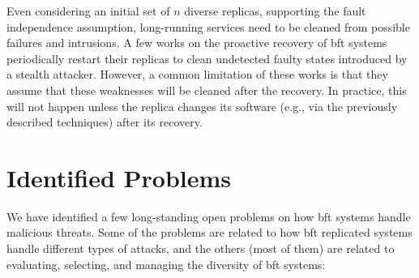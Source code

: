 Even considering an initial set of $n$ diverse replicas, supporting the fault independence assumption, long-running services need to be cleaned from possible failures and intrusions.
A few works on the proactive recovery of \gls{bft} systems~\cite{Castro:2002,Sousa:2010,Roeder:2010,Platania:2014,Distler:2011} periodically restart their replicas to clean undetected faulty states introduced by a stealth attacker. 
However, a common limitation of these works is that they assume that these weaknesses will be cleaned after the recovery.
In practice, this will not happen unless the replica changes its software (e.g., via the previously described techniques) after its recovery.



\section{Identified Problems}
We have identified a few long-standing open problems on how \gls{bft} systems handle malicious threats. 
Some of the problems are related to how \gls{bft} replicated systems handle different types of attacks, and the others (most of them) are related to evaluating, selecting, and managing
the diversity of \gls{bft} systems:


